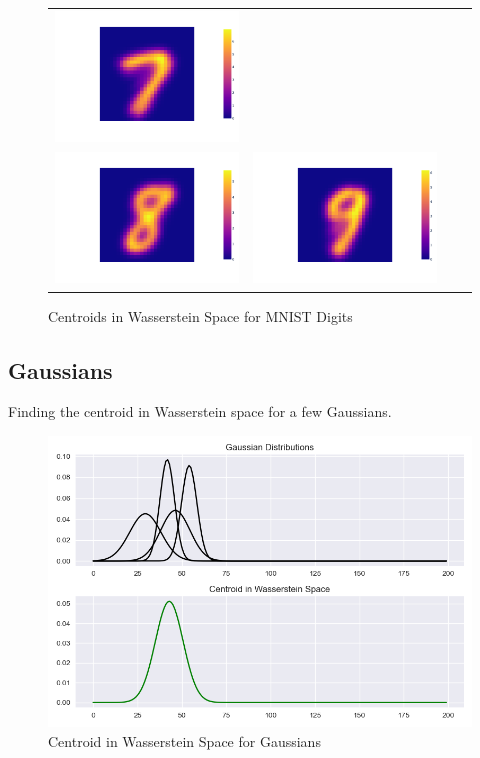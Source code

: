 \documentclass{article}
\begin{document}
\begin{figure}[htb]
\begin{tabular}{@{}cccc@{}}
                \includegraphics[width=.24\textwidth]{images/q7/digit_7.png}   \\
                \includegraphics[width=.24\textwidth]{images/q7/digit_8.png} &
                \includegraphics[width=.24\textwidth]{images/q7/digit_9.png} \\
            \end{tabular}
            \caption{Centroids in Wasserstein Space for MNIST Digits}
        \end{figure}

    \subsection{Gaussians}
        
        Finding the centroid in Wasserstein space for a few Gaussians.

        \begin{figure}[h]
            \includegraphics[width=\linewidth]{images/q7/gaussian.png}
            \caption{Centroid in Wasserstein Space for Gaussians}
        \end{figure}
\end{document}
